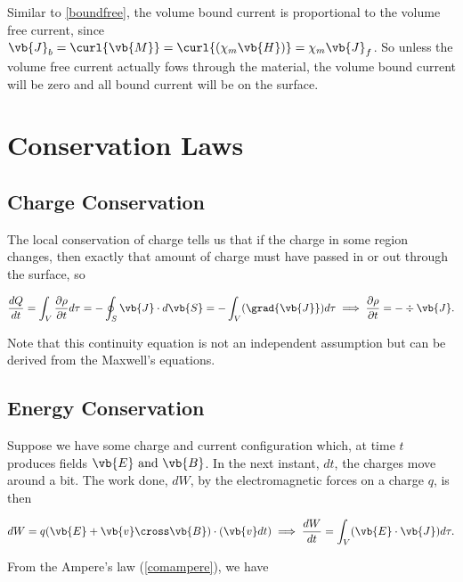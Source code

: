 \documentclass[english,a4paper,12pt]{report}
\begin{document}
Similar to \cref{boundfree}, the volume bound current is proportional to the volume free current, since \(\vb{J} _{b} = \curl{\vb{M} } = \curl{(\chi _{m}\vb{H}  )} = \chi _{m}\vb{J} _{f} \). So unless the volume free current actually fows through the material, the volume bound current will be zero and all bound current will be on the surface.  


\chapter{Conservation Laws}

\section{Charge Conservation}

The local conservation of charge tells us that if the charge in some region changes, then exactly that amount of charge must have passed in or out through the surface, so 

\begin{equation}
    \frac{dQ}{dt} = \int_{V}^{} \frac{\partial \rho }{\partial t} d\tau =   -\oint_{S} \vb{J} \cdot d\vb{S}  = -\int_{V}^{} (\grad{\vb{J} } ) d\tau   \implies \frac{\partial \rho }{\partial t} = - \div{\vb{J} }.   \label{contincharge} 
\end{equation}

Note that this continuity equation is not an independent assumption but can be derived from the Maxwell's equations.

\section{Energy Conservation}

Suppose we have some charge and current configuration which, at time \(t\) produces fields \(\vb{E} \text { and } \vb{B} \). In the next instant, \(dt\), the charges move around a bit. The work done, \(dW\), by the electromagnetic forces on a charge \(q\), is then 

\begin{equation}
    dW = q(\vb{E} + \vb{v} \cross \vb{B} ) \cdot (\vb{v} dt) \implies \frac{dW}{dt} = \int_{V}^{} (\vb{E} \cdot \vb{J} )d\tau . \label{dW} 
\end{equation}

From the Ampere's law (\cref{comampere}), we have 
\end{document}
